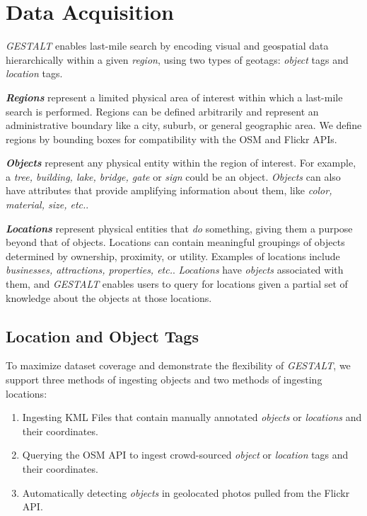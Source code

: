 \section{Data Acquisition}
\label{section:data}

\emph{GESTALT} enables last-mile search by encoding visual and geospatial data hierarchically within a given \emph{region}, using two types of geotags: \emph{object} tags and \emph{location} tags.

\textbf{\emph{Regions}} represent a limited physical area of interest within which a last-mile search is performed. 
Regions can be defined arbitrarily and represent an administrative boundary like a city, suburb, or general geographic area.
We define regions by bounding boxes for compatibility with the OSM and Flickr APIs.

\textbf{\emph{Objects}} represent any physical entity within the region of interest. 
For example, a \textit{tree, building, lake, bridge, gate} or \textit{sign} could be an object. 
\textit{Objects} can also have attributes that provide amplifying information about them, like \textit{color, material, size, etc.}. 

\textbf{\emph{Locations}} represent physical entities that \textit{do} something, giving them a purpose beyond that of objects. 
Locations can contain meaningful groupings of objects determined by ownership, proximity, or utility. 
Examples of locations include \textit{businesses, attractions, properties, etc.}. 
\textit{Locations} have \textit{objects} associated with them, and \emph{GESTALT} enables users to query for locations given a partial set of knowledge about the objects at those locations.

\subsection{Location and Object Tags}
To maximize dataset coverage and demonstrate the flexibility of \emph{GESTALT}, we support three methods of ingesting objects and two methods of ingesting locations:
\begin{enumerate}
    \item Ingesting KML Files that contain manually annotated \textit{objects} or \textit{locations} and their coordinates.
    \item Querying the OSM API to ingest crowd-sourced \textit{object} or \textit{location} tags and their coordinates.
    \item Automatically detecting \textit{objects} in geolocated photos pulled from the Flickr API. 
\end{enumerate}

